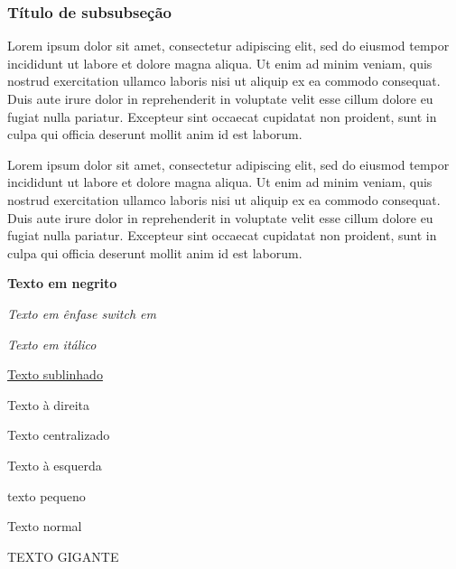 \documentclass[12pt]{article}
\begin{document}
	\subsubsection{Título de subsubseção}
		Lorem ipsum dolor sit amet, consectetur adipiscing elit, sed do eiusmod tempor incididunt ut labore et dolore magna aliqua. Ut enim ad minim veniam, quis nostrud exercitation ullamco laboris nisi ut aliquip ex ea commodo consequat. Duis aute irure dolor in reprehenderit in voluptate velit esse cillum dolore eu fugiat nulla pariatur. Excepteur sint occaecat cupidatat non proident, sunt in culpa qui officia deserunt mollit anim id est laborum.
		
		Lorem ipsum dolor sit amet, consectetur adipiscing elit, sed do eiusmod tempor incididunt ut labore et dolore magna aliqua. Ut enim ad minim veniam, quis nostrud exercitation ullamco laboris nisi ut aliquip ex ea commodo consequat. Duis aute irure dolor in reprehenderit in voluptate velit esse cillum dolore eu fugiat nulla pariatur. Excepteur sint occaecat cupidatat non proident, sunt in culpa qui officia deserunt mollit anim id est laborum.
		\newpage %

	\textbf{Texto em negrito}
	
	{\em Texto em ênfase switch em}
	
	\textit{Texto em itálico}
	
	\underline{Texto sublinhado}
	
	\begin{flushright}
		Texto à direita
	\end{flushright}
	
	\begin{center}
		Texto centralizado
	\end{center}
	
	\begin{flushleft}
		Texto à esquerda
	\end{flushleft}
	
	\begin{tiny}
		texto pequeno
	\end{tiny}
	
	Texto normal
	
	{\Huge TEXTO GIGANTE}
	
	\newpage
	
\end{document}
